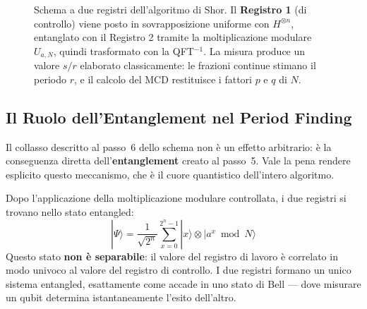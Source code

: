 \begin{onehalfspace}
\begin{figure}[H]
{%
}
\caption[Schema a due registri dell'algoritmo di Shor]{Schema a due registri dell'algoritmo di Shor. Il \textbf{Registro 1} (di controllo) viene posto in sovrapposizione uniforme con $H^{\otimes n}$, entanglato con il Registro 2 tramite la moltiplicazione modulare $U_{a,N}$, quindi trasformato con la QFT$^{-1}$. La misura produce un valore $s/r$ elaborato classicamente: le frazioni continue stimano il periodo $r$, e il calcolo del MCD restituisce i fattori $p$ e $q$ di $N$.}
\label{fig:shor_schema}
\end{figure}
\subsection{Il Ruolo dell'Entanglement nel Period Finding}
\label{sec:entanglement_shor}

Il collasso descritto al passo~6 dello schema non è un effetto arbitrario: è la conseguenza diretta dell'\textbf{entanglement} creato al passo~5. Vale la pena rendere esplicito questo meccanismo, che è il cuore quantistico dell'intero algoritmo.

Dopo l'applicazione della moltiplicazione modulare controllata, i due registri si trovano nello stato entangled:
\begin{equation}
    |\Psi\rangle = \frac{1}{\sqrt{2^n}} \sum_{x=0}^{2^n-1} |x\rangle \otimes |a^x \bmod N\rangle
    \label{eq:stato_entangled_shor}
\end{equation}
Questo stato \textbf{non è separabile}: il valore del registro di lavoro è correlato in modo univoco al valore del registro di controllo. I due registri formano un unico sistema entangled, esattamente come accade in uno stato di Bell --- dove misurare un qubit determina istantaneamente l'esito dell'altro.


\end{onehalfspace}
